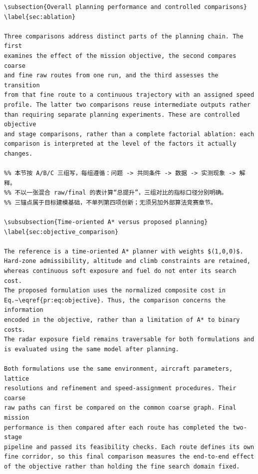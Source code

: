 \documentclass[12pt]{article}
\begin{document}
\begin{verbatim}
\subsection{Overall planning performance and controlled comparisons}
\label{sec:ablation}

Three comparisons address distinct parts of the planning chain. The first
examines the effect of the mission objective, the second compares coarse
and fine raw routes from one run, and the third assesses the transition
from that fine route to a continuous trajectory with an assigned speed
profile. The latter two comparisons reuse intermediate outputs rather
than requiring separate planning experiments. These are controlled objective
and stage comparisons, rather than a complete factorial ablation: each
comparison is interpreted at the level of the factors it actually changes.

%% 本节按 A/B/C 三组写，每组遵循：问题 -> 共同条件 -> 数据 -> 实测现象 -> 解释。
%% 不以一张混合 raw/final 的表计算“总提升”，三组对比的指标口径分别明确。
%% 三锚点属于目标建模基础，不单列第四项创新；无须另加外部算法竞赛章节。

\subsubsection{Time-oriented A* versus proposed planning}
\label{sec:objective_comparison}

The reference is a time-oriented A* planner with weights $(1,0,0)$.
Hard-zone admissibility, altitude and climb constraints are retained,
whereas continuous soft exposure and fuel do not enter its search cost.
The proposed formulation uses the normalized composite cost in
Eq.~\eqref{pr:eq:objective}. Thus, the comparison concerns the information
encoded in the objective, rather than a limitation of A* to binary costs.
The radar exposure field remains traversable for both formulations and
is evaluated using the same model after planning.

Both formulations use the same environment, aircraft parameters, lattice
resolutions and refinement and speed-assignment procedures. Their coarse
raw paths can first be compared on the common coarse graph. Final mission
performance is then compared after each route has completed the two-stage
pipeline and passed its feasibility checks. Each route defines its own
fine corridor, so this final comparison measures the end-to-end effect
of the objective rather than holding the fine search domain fixed.


\end{verbatim}
\end{document}
